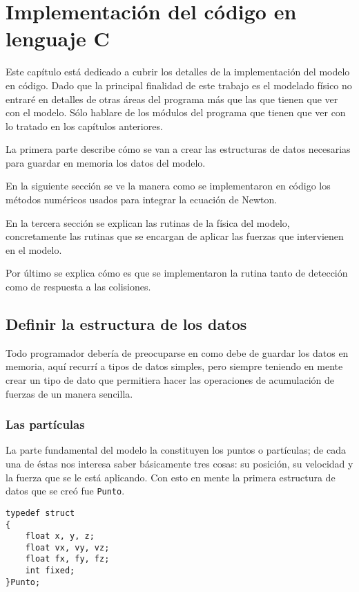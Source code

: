 \chapter{Implementación del código en lenguaje C}
Este capítulo está dedicado a cubrir los detalles de la implementación del modelo en código.
Dado que la principal finalidad de este trabajo es el modelado físico no entraré en detalles de otras áreas del programa más que las que tienen que ver con el modelo.
Sólo hablare de los módulos del programa que tienen que ver con lo tratado en los capítulos anteriores.

La primera parte describe cómo se van a crear las estructuras de datos necesarias para guardar en memoria los datos del modelo.

En la siguiente sección se ve la manera como se implementaron en código los métodos numéricos usados para integrar la ecuación de Newton.

En la tercera sección se explican las rutinas de la física del modelo, concretamente las rutinas que se encargan de aplicar las fuerzas que intervienen en el modelo.

Por último se explica cómo es que se implementaron la rutina tanto de detección como de respuesta a las colisiones.

\section{Definir la estructura de los datos}
Todo programador debería de preocuparse en como debe de guardar los datos en memoria, aquí recurrí a tipos de datos simples, pero siempre teniendo en mente crear un tipo de dato que permitiera hacer las operaciones de acumulación de fuerzas de un manera sencilla.

\subsection{Las partículas}
La parte fundamental del modelo la constituyen los puntos o partículas; de cada una de éstas nos interesa saber básicamente tres cosas: su posición, su velocidad y la fuerza que se le está aplicando.
Con esto en mente la primera estructura de datos que se creó fue \verb|Punto|.

\begin{verbatim}
typedef struct
{
    float x, y, z;
    float vx, vy, vz;
    float fx, fy, fz;
    int fixed;
}Punto;
\end{verbatim}


